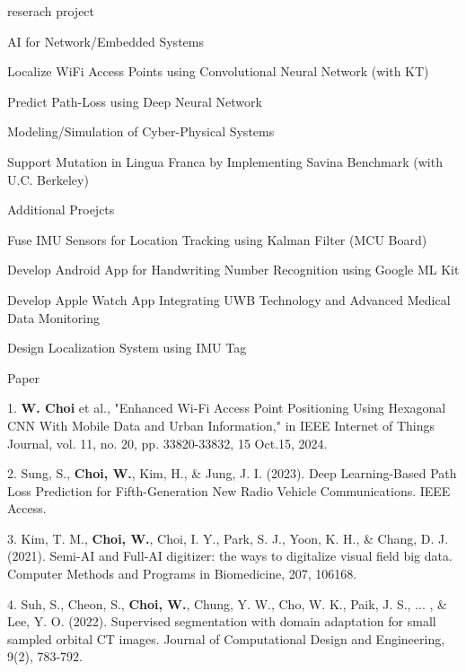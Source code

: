 \documentclass[
	11pt, %
]{resume} %
\begin{document}
\begin{rSection}{reserach project}
	\begin{rSubsection}{AI for Network/Embedded Systems}{}{}{}
		\item Localize WiFi Access Points using Convolutional Neural Network (with KT)
		\item Predict Path-Loss using Deep Neural Network
	
	\end{rSubsection}

	\begin{rSubsection}{Modeling/Simulation of Cyber-Physical Systems}{}{}{}
		\item Support Mutation in Lingua Franca by Implementing Savina Benchmark (with U.C. Berkeley)
	\end{rSubsection}

	
	\begin{rSubsection}{Additional Proejcts}{}{}{}
		\item Fuse IMU Sensors for Location Tracking using Kalman Filter (MCU Board)
		\item Develop Android App for Handwriting Number Recognition using Google ML Kit
		\item Develop Apple Watch App Integrating UWB Technology and Advanced Medical Data Monitoring
		\item Design Localization System using IMU Tag
	\end{rSubsection}
\end{rSection}



\begin{rSection}{Paper}

	1. \textbf{W. Choi} et al., "Enhanced Wi-Fi Access Point Positioning Using Hexagonal CNN With Mobile Data and Urban Information," in IEEE Internet of Things Journal, vol. 11, no. 20, pp. 33820-33832, 15 Oct.15, 2024.

	2. Sung, S., \textbf{Choi, W.}, Kim, H., \& Jung, J. I. (2023). Deep Learning-Based Path Loss Prediction for Fifth-Generation New Radio Vehicle Communications. IEEE Access.
	
	3. Kim, T. M., \textbf{Choi, W.}, Choi, I. Y., Park, S. J., Yoon, K. H., \& Chang, D. J. (2021). Semi-AI and Full-AI digitizer: the ways to digitalize visual field big data. Computer Methods and Programs in Biomedicine, 207, 106168.

	4. Suh, S., Cheon, S., \textbf{Choi, W.}, Chung, Y. W., Cho, W. K., Paik, J. S., ... , \& Lee, Y. O. (2022). Supervised segmentation with domain adaptation for small sampled orbital CT images. Journal of Computational Design and Engineering, 9(2), 783-792.


\end{rSection}
\end{document}
